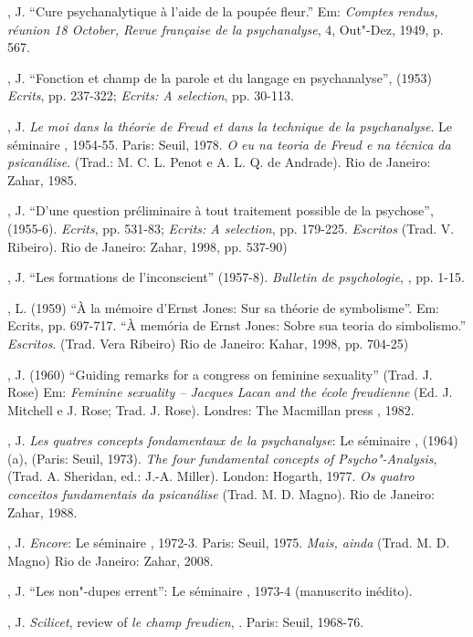 , J. ``Cure psychanalytique à l'aide de la poupée fleur.'' Em:
\emph{Comptes rendus, réunion 18 October, Revue française de la
psychanalyse}, 4, Out"-Dez, 1949, p. 567.

, J. ``Fonction et champ de la parole et du langage en
psychanalyse'', (1953) \emph{Ecrits}, pp. 237-322; \emph{Ecrits: A
selection}, pp. 30-113.

, J. \emph{Le moi dans la théorie de Freud et dans la technique de
la psychanalyse}. Le séminaire , 1954-55. Paris: Seuil, 1978. \emph{O
eu na teoria de Freud e na técnica da psicanálise}. (Trad.: M. C. L.
Penot e A. L. Q. de Andrade). Rio de Janeiro: Zahar, 1985.

, J. ``D'une question préliminaire à tout traitement possible de la
psychose'', (1955-6). \emph{Ecrits}, pp. 531-83; \emph{Ecrits: A
selection}, pp. 179-225. \emph{Escritos} (Trad. V. Ribeiro). Rio de
Janeiro: Zahar, 1998, pp. 537-90)

, J. ``Les formations de l'inconscient'' (1957-8). \emph{Bulletin de
psychologie}, , pp. 1-15.

, L. (1959) ``À la mémoire d'Ernst Jones: Sur sa théorie de
symbolisme''. Em: Ecrits, pp. 697-717. ``À memória de Ernst Jones: Sobre
sua teoria do simbolismo.'' \emph{Escritos}. (Trad. Vera Ribeiro) Rio
de Janeiro: Kahar, 1998, pp. 704-25)

, J. (1960) ``Guiding remarks for a congress on feminine sexuality''
(Trad. J. Rose) Em: \emph{Feminine sexuality -- Jacques Lacan and the
école freudienne} (Ed. J. Mitchell e J. Rose; Trad. J. Rose).
Londres: The Macmillan press , 1982.

, J. \emph{Les quatres concepts fondamentaux de la psychanalyse}:
Le séminaire , (1964) (a), (Paris: Seuil, 1973). \emph{The four
fundamental concepts of Psycho"-Analysis}, (Trad. A. Sheridan, ed.:
J.-A. Miller). London: Hogarth, 1977. \emph{Os quatro conceitos
fundamentais da psicanálise} (Trad. M. D. Magno). Rio de Janeiro:
Zahar, 1988.

, J. \emph{Encore}: Le séminaire , 1972-3. Paris: Seuil, 1975.
\emph{Mais, ainda} (Trad. M. D. Magno) Rio de Janeiro: Zahar, 2008.

, J. ``Les non"-dupes errent'': Le séminaire , 1973-4 (manuscrito
inédito).

, J. \emph{Scilicet}, review of \emph{le champ freudien}, .
Paris: Seuil, 1968-76.

